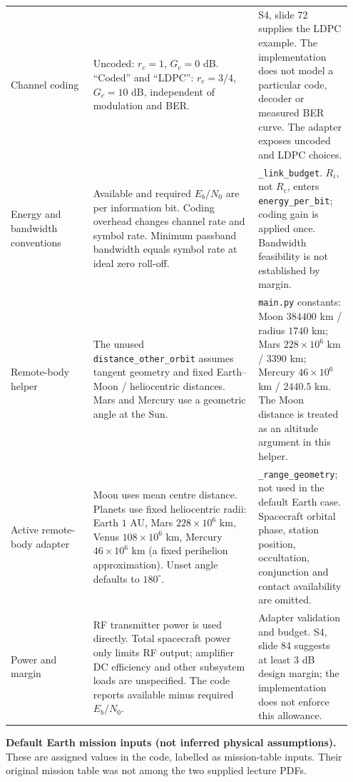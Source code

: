 \documentclass[10pt,a4paper]{article}
\newcommand{\code}[1]{\nolinkurl{#1}}
\begin{document}
\begin{longtable}{@{}P{0.23\linewidth}P{0.46\linewidth}P{0.26\linewidth}@{}}
Channel coding
& Uncoded: $r_c=1$, $G_c=0$ dB. ``Coded'' and ``LDPC'': $r_c=3/4$,
$G_c=10$ dB, independent of modulation and BER.
& S4, slide 72 supplies the LDPC example. The implementation does not model
a particular code, decoder or measured BER curve. The adapter exposes uncoded
and LDPC choices. \\

Energy and bandwidth conventions
& Available and required $E_b/N_0$ are per information bit. Coding overhead
changes channel rate and symbol rate. Minimum passband bandwidth equals symbol
rate at ideal zero roll-off.
& \code{_link_budget}. $R_i$, not $R_c$, enters \code{energy_per_bit}; coding
gain is applied once. Bandwidth feasibility is not established by margin. \\

Remote-body helper
& The unused \code{distance_other_orbit} assumes tangent geometry and fixed
Earth--Moon / heliocentric distances. Mars and Mercury use a geometric angle
at the Sun.
& \code{main.py} constants: Moon $384400$ km / radius $1740$ km;
Mars $228\times10^6$ km / $3390$ km; Mercury $46\times10^6$ km / $2440.5$ km.
The Moon distance is treated as an altitude argument in this helper. \\

Active remote-body adapter
& Moon uses mean centre distance. Planets use fixed heliocentric radii:
Earth $1$ AU, Mars $228\times10^6$ km, Venus $108\times10^6$ km,
Mercury $46\times10^6$ km (a fixed perihelion approximation).
Unset angle defaults to $180^\circ$.
& \code{_range_geometry}; not used in the default Earth case. Spacecraft
orbital phase, station position, occultation, conjunction and contact
availability are omitted. \\

Power and margin
& RF transmitter power is used directly. Total spacecraft power only limits
RF output; amplifier DC efficiency and other subsystem loads are unspecified.
The code reports available minus required $E_b/N_0$.
& Adapter validation and budget. S4, slide 84 suggests at least $3$ dB design
margin; the implementation does not enforce this allowance. \\
\end{longtable}

\normalsize
\textbf{Default Earth mission inputs (not inferred physical assumptions).}
These are assigned values in the code, labelled as mission-table inputs.
Their original mission table was not among the two supplied lecture PDFs.
\end{document}

